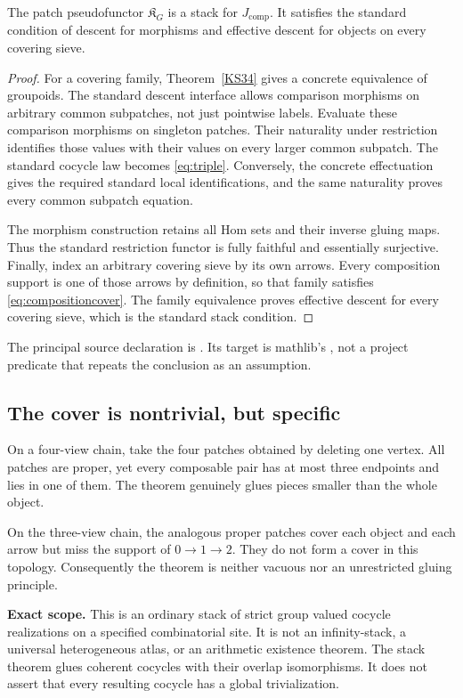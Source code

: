 \begin{theorem}\label{KS36}
The patch pseudofunctor \(\mathfrak K_G\) is a stack for \(J_{\mathrm{comp}}\). It satisfies the standard condition of descent for morphisms and effective descent for objects on every covering sieve.
\end{theorem}
\begin{proof}
For a covering family, Theorem~\ref{KS34} gives a concrete equivalence of groupoids. The standard descent interface allows comparison morphisms on arbitrary common subpatches, not just pointwise labels. Evaluate these comparison morphisms on singleton patches. Their naturality under restriction identifies those values with their values on every larger common subpatch. The standard cocycle law becomes \eqref{eq:triple}. Conversely, the concrete effectuation gives the required standard local identifications, and the same naturality proves every common subpatch equation.

The morphism construction retains all Hom sets and their inverse gluing maps. Thus the standard restriction functor is fully faithful and essentially surjective. Finally, index an arbitrary covering sieve by its own arrows. Every composition support is one of those arrows by definition, so that family satisfies \eqref{eq:compositioncover}. The family equivalence proves effective descent for every covering sieve, which is the standard stack condition.
\end{proof}
The principal source declaration is . Its target is mathlib's , not a project predicate that repeats the conclusion as an assumption.

\subsection{The cover is nontrivial, but specific}
On a four-view chain, take the four patches obtained by deleting one vertex. All patches are proper, yet every composable pair has at most three endpoints and lies in one of them. The theorem genuinely glues pieces smaller than the whole object.

On the three-view chain, the analogous proper patches cover each object and each arrow but miss the support of \(0\to1\to2\). They do not form a cover in this topology. Consequently the theorem is neither vacuous nor an unrestricted gluing principle.

\begin{scopebox}
\textbf{Exact scope.} This is an ordinary stack of strict group valued cocycle realizations on a specified combinatorial site. It is not an infinity-stack, a universal heterogeneous atlas, or an arithmetic existence theorem. The stack theorem glues coherent cocycles with their overlap isomorphisms. It does not assert that every resulting cocycle has a global trivialization.
\end{scopebox}

